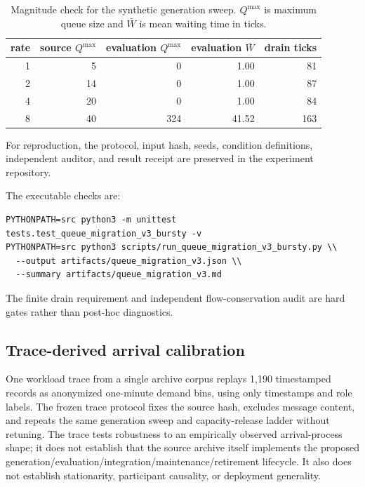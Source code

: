 \documentclass[11pt]{article}
\begin{document}
\begin{table}[t]
  \centering
  \caption{Magnitude check for the synthetic generation sweep. \(Q^{\max}\) is maximum queue size and \(\bar W\) is mean waiting time in ticks.}
  \label{tab:generation-magnitude}
  \begin{tabular}{rrrrr}
    \toprule
    rate & source \(Q^{\max}\) & evaluation \(Q^{\max}\) & evaluation \(\bar W\) & drain ticks \\
    \midrule
    1 & 5  & 0   & 1.00  & 81  \\
    2 & 14 & 0   & 1.00  & 87  \\
    4 & 20 & 0   & 1.00  & 84  \\
    8 & 40 & 324 & 41.52 & 163 \\
    \bottomrule
  \end{tabular}
\end{table}

For reproduction, the protocol, input hash, seeds, condition definitions, independent auditor, and result receipt are preserved in the experiment repository.
\begin{samepage}
The executable checks are:
\begin{verbatim}
PYTHONPATH=src python3 -m unittest tests.test_queue_migration_v3_bursty -v
PYTHONPATH=src python3 scripts/run_queue_migration_v3_bursty.py \\
  --output artifacts/queue_migration_v3.json \\
  --summary artifacts/queue_migration_v3.md
\end{verbatim}
The finite drain requirement and independent flow-conservation audit are hard gates rather than post-hoc diagnostics.
\end{samepage}

\subsection{Trace-derived arrival calibration}

One workload trace from a single archive corpus replays 1,190 timestamped records as anonymized one-minute demand bins, using only timestamps and role labels. The frozen trace protocol fixes the source hash, excludes message content, and repeats the same generation sweep and capacity-release ladder without retuning. The trace tests robustness to an empirically observed arrival-process shape; it does not establish that the source archive itself implements the proposed generation/evaluation/integration/maintenance/retirement lifecycle. It also does not establish stationarity, participant causality, or deployment generality.
\end{document}
